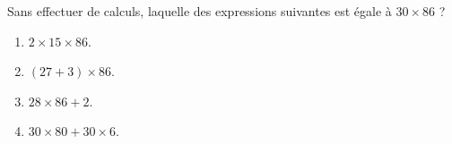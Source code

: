 
\begin{exercice}\label{exosmath-0761}

    Sans effectuer de calculs, laquelle des expressions suivantes est égale à \( 30\times 86\) ?
    \begin{multicols}{2}
        \begin{enumerate}
            \item
                \( 2\times 15\times 86\).
            \item
                \( (27+3)\times 86\).
            \item
                \( 28\times 86+2\).
            \item
                \(  30\times 80+30\times 6  \).
        \end{enumerate}
    \end{multicols}

\end{exercice}
